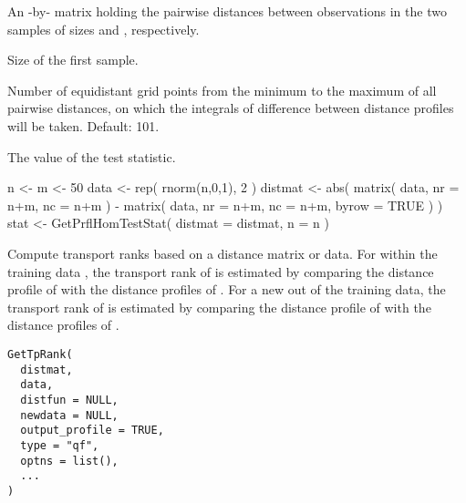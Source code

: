 \documentclass[a4paper]{book}
\begin{document}
%
\begin{Arguments}
\begin{ldescription}
\item[\code{distmat}] An -by- matrix holding the pairwise distances between observations 
in the two samples of sizes  and , respectively.

\item[\code{n}] Size of the first sample.

\item[\code{nRegGrid}] Number of equidistant grid points from the minimum to the maximum of all pairwise distances,
on which the integrals of difference between distance profiles will be taken. Default: 101.
\end{ldescription}
\end{Arguments}
%
\begin{Value}
The value of the test statistic.
\end{Value}
%
\begin{Examples}
\begin{ExampleCode}
n <- m <- 50
data <- rep( rnorm(n,0,1), 2 )
distmat <- abs( matrix( data, nr = n+m, nc = n+m ) - matrix( data, nr = n+m, nc = n+m, byrow = TRUE ) )
stat <- GetPrflHomTestStat( distmat = distmat, n = n )
\end{ExampleCode}
\end{Examples}
%
\begin{Description}\relax
Compute transport ranks based on a distance matrix or data. 
For  within the training data , 
the transport rank of  is estimated by comparing the distance profile of  with 
the distance profiles of . 
For a new  out of the training data, 
the transport rank of  is estimated by comparing the distance profile of  with 
the distance profiles of .
\end{Description}
%
\begin{Usage}
\begin{verbatim}
GetTpRank(
  distmat,
  data,
  distfun = NULL,
  newdata = NULL,
  output_profile = TRUE,
  type = "qf",
  optns = list(),
  ...
)
\end{verbatim}
\end{Usage}
%
\end{document}
